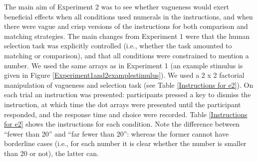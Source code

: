 
The main aim of Experiment 2 was to see whether vagueness would exert beneficial effects when all conditions used numerals in the instructions, and when there were vague and crisp versions of the instructions for both comparison and matching strategies. The main changes from Experiment 1 were that the human selection task was explicitly controlled (i.e., whether the task amounted to matching or comparison), and that all conditions were constrained to mention a number. We used the same arrays as in Experiment 1 (an example stimulus is given in Figure \ref{Experiment1and2examplestimulus}). We used a 2 x 2 factorial manipulation of vagueness and selection task (see Table \ref{Instructions for e2}). On each trial an instruction was presented: participants pressed a key to dismiss the instruction, at which time the dot arrays were presented until the participant responded, and the response time and choice were recorded. Table \ref{Instructions for e2} shows the instructions for each condition. Note the difference between ``fewer than 20'' and ``far fewer than 20'': whereas the former cannot have borderline cases (i.e., for each number it is clear whether the number is smaller than 20 or not), the latter can.

